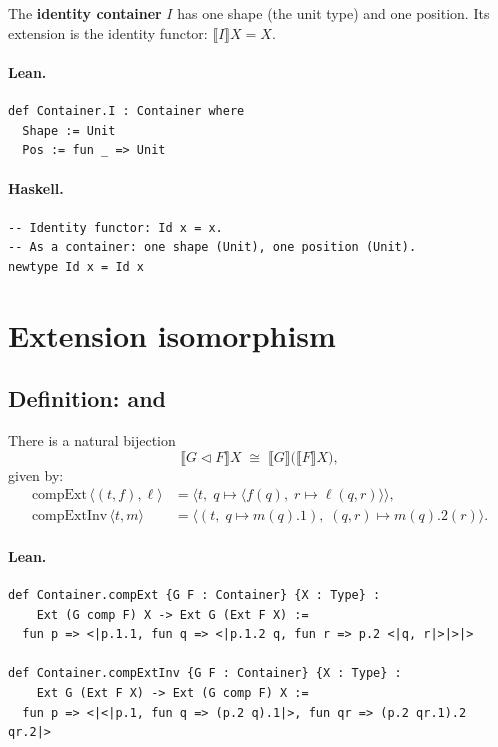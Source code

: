 \documentclass[11pt,a4paper]{article}
\begin{document}
\begin{defn}
The \textbf{identity container} $I$ has one shape (the unit type) and one
position.  Its extension is the identity functor: $\llbracket I \rrbracket X
= X$.
\end{defn}

\paragraph{Lean.}
\begin{lstlisting}[style=lean]
def Container.I : Container where
  Shape := Unit
  Pos := fun _ => Unit
\end{lstlisting}

\paragraph{Haskell.}
\begin{lstlisting}[style=haskell]
-- Identity functor: Id x = x.
-- As a container: one shape (Unit), one position (Unit).
newtype Id x = Id x
\end{lstlisting}

\section{Extension isomorphism}

\subsection{Definition:  and }

\begin{defn}
There is a natural bijection
\[
  \llbracket G \triangleleft F \rrbracket X \;\cong\; \llbracket G \rrbracket
  \bigl(\llbracket F \rrbracket X\bigr),
\]
given by:
\begin{align*}
  \mathrm{compExt}\,\langle (t, f), \ell \rangle
    &= \langle t,\; q \mapsto \langle f(q),\; r \mapsto \ell(q, r) \rangle \rangle, \\
  \mathrm{compExtInv}\,\langle t, m \rangle
    &= \langle (t,\; q \mapsto m(q).1),\; (q, r) \mapsto m(q).2(r) \rangle.
\end{align*}
\end{defn}

\paragraph{Lean.}
\begin{lstlisting}[style=lean]
def Container.compExt {G F : Container} {X : Type} :
    Ext (G comp F) X -> Ext G (Ext F X) :=
  fun p => <|p.1.1, fun q => <|p.1.2 q, fun r => p.2 <|q, r|>|>|>

def Container.compExtInv {G F : Container} {X : Type} :
    Ext G (Ext F X) -> Ext (G comp F) X :=
  fun p => <|<|p.1, fun q => (p.2 q).1|>, fun qr => (p.2 qr.1).2 qr.2|>
\end{lstlisting}
\end{document}
